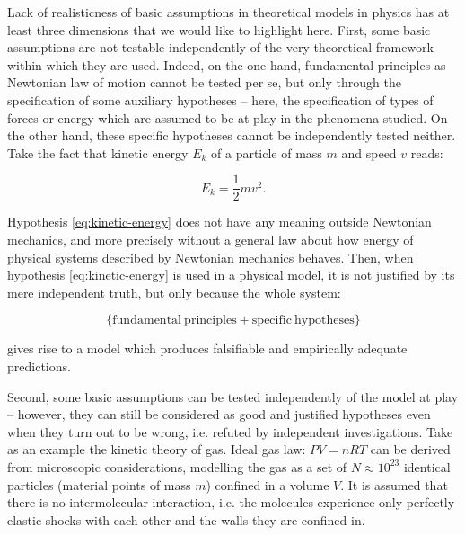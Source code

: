 \documentclass[a4paper,11pt]{article}
\theoremstyle{definition}
\begin{document}
Lack of realisticness of basic assumptions in theoretical models in physics has at least three dimensions that we would like to highlight here. First, some basic assumptions are not testable independently of the very theoretical framework within which they are used. Indeed, on the one hand, fundamental principles as Newtonian law of motion cannot be tested per se, but only through the specification of some auxiliary hypotheses -- here, the specification of types of forces or energy which are assumed to be at play in the phenomena studied. On the other hand, these specific hypotheses cannot be independently tested neither. Take the fact that kinetic energy $E_k$ of a particle of mass $m$ and speed $v$ reads: 

\begin{equation}
E_k=\frac{1}{2}mv^2.
\label{eq:kinetic-energy}
\end{equation}

Hypothesis \eqref{eq:kinetic-energy} does not have any meaning outside Newtonian mechanics, and more precisely without a general law about how energy of physical systems described by Newtonian mechanics behaves. Then, when hypothesis \eqref{eq:kinetic-energy} is used in a physical model, it is not justified by its mere independent truth, but only because the whole system:

\begin{equation}
\{\mathrm{fundamental~principles + specific~hypotheses}\}
\label{eq:pattern_expl}
\end{equation}

gives rise to a model which produces falsifiable and empirically adequate predictions.

Second, some basic assumptions can be tested independently of the model at play -- however, they can still be considered as good and justified hypotheses even when they turn out to be wrong, i.e. refuted by independent investigations. Take as an example the kinetic theory of gas. Ideal gas law: $PV=nRT$ can be derived from microscopic considerations, modelling the gas as a set of $N\approx 10^{23}$ identical particles (material points of mass $m$) confined in a volume $V$. It is assumed that there is no intermolecular interaction, i.e. the molecules experience only perfectly elastic shocks with each other and the walls they are confined in.
\end{document}
